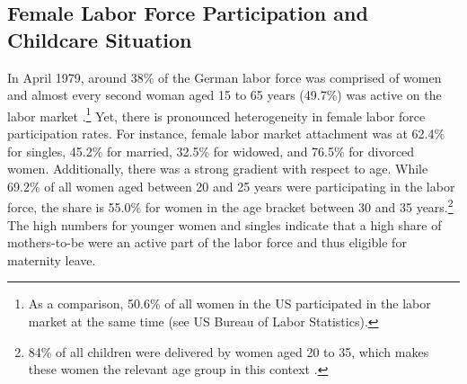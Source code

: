 \documentclass[11pt, a4paper]{article} %
\begin{document}
\subsection{Female Labor Force Participation and Childcare Situation}
In April 1979, around 38\% of the German labor force was comprised of women and almost every second woman aged 15 to 65 years (49.7\%) was active on the labor market \citep{federalstatisticaloffice1981yearbook}.\footnote{As a comparison, 50.6\% of all women in the US participated in the labor market at the same time (see US Bureau of Labor Statistics).} Yet, there is pronounced heterogeneity in female labor force participation rates. For instance, female labor market attachment was at 62.4\% for singles, 45.2\% for married, 32.5\% for widowed, and 76.5\% for divorced women. Additionally, there was a strong gradient with respect to age. While 69.2\% of all women aged between 20 and 25 years were participating in the labor force, the share is 55.0\% for women in the age bracket between 30 and 35 years.\footnote{84\% of all children were delivered by
women aged 20 to 35, which makes these women the relevant age group in this context \citep{federalstatisticaloffice1981yearbook}.} The high numbers for younger women and singles indicate that a high share of mothers-to-be were an active part of the labor force and thus eligible for maternity leave. \newline 
\end{document}
